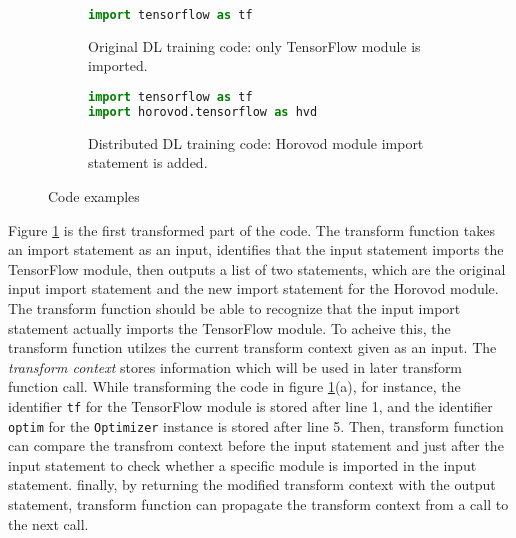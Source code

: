\begin{figure}[ht!]
  \centering
  \begin{subfigure}[t]{0.48\textwidth}
    \begin{lstlisting}[language=Python]
import tensorflow as tf\end{lstlisting}
    \caption{Original DL training code: only TensorFlow module is imported.}
  \end{subfigure}
  \hspace{5mm}
  \begin{subfigure}[t]{0.48\textwidth}
    \begin{lstlisting}[language=Python]
import tensorflow as tf
import horovod.tensorflow as hvd\end{lstlisting}
    \caption{Distributed DL training code: Horovod module import statement is added.}
  \end{subfigure}
  \caption{Code examples}
  \label{fig:trans:ex01}
\end{figure}

Figure \ref{fig:trans:ex01} is the first transformed part of the code.
The transform function takes an import statement as an input,
identifies that the input statement imports the TensorFlow module,
then outputs a list of two statements, which are the original input 
import statement and the new import statement for the Horovod module. 
The transform function should be able to recognize that the input import
statement actually imports the TensorFlow module.
To acheive this, the transform function utilzes the current transform context given
as an input.
The \textit{transform context} stores information 
which will be used in later transform function call.  
While transforming the code in figure \ref{fig:trans:ex01}(a),
for instance, the identifier {\tt tf} for the TensorFlow
module is stored after line 1, and the identifier {\tt optim}
for the {\tt Optimizer} instance is stored after line 5.
Then, transform function can compare the transfrom context before the input statement
and just after the input statement to check whether a specific module
is imported in the input statement.
finally, by returning the modified transform context with the output statement,
transform function can propagate the transform context from a call
to the next call.

